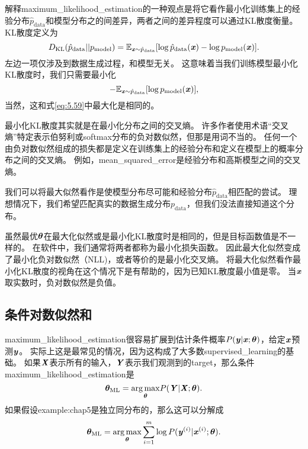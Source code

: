 解释\gls{maximum_likelihood_estimation}的一种观点是将它看作最小化训练集上的经验分布$\hat{p}_{\text{data}}$和模型分布之的间差异，两者之间的差异程度可以通过KL散度衡量。
KL散度定义为
\begin{equation}
    D_{\text{KL}}(\hat{p}_{\text{data}} || p_{\text{model}}) = \mathbb{E}_{\boldsymbol{\mathit{x}} \sim \hat{p}_{\text{data}}} [ \log \hat{p}_{\text{data}}(\boldsymbol{\mathit{x}}) - \log p_{\text{model}}(\boldsymbol{\mathit{x}}) ] .
\end{equation}
左边一项仅涉及到数据生成过程，和模型无关。
这意味着当我们训练模型最小化KL散度时，我们只需要最小化
\begin{equation}
    -\mathbb{E}_{\boldsymbol{\mathit{x}} \sim \hat{p}_{\text{data}}} [ \log p_{\text{model}}(\boldsymbol{\mathit{x}})  ] ,
\end{equation}
当然，这和式\ref{eq:5.59}中最大化是相同的。


最小化KL散度其实就是在最小化分布之间的交叉熵。
许多作者使用术语“交叉熵”特定表示伯努利或softmax分布的负对数似然，但那是用词不当的。
任何一个由负对数似然组成的损失都是定义在训练集上的经验分布和定义在模型上的概率分布之间的交叉熵。
例如，\gls{mean_squared_error}是经验分布和高斯模型之间的交叉熵。

我们可以将最大似然看作是使模型分布尽可能和经验分布$\hat{p}_{\text{data}}$相匹配的尝试。
理想情况下，我们希望匹配真实的数据生成分布$p_{\text{data}}$，但我们没法直接知道这个分布。

虽然最优$\boldsymbol{\theta}$在最大化似然或是最小化KL散度时是相同的，但是目标函数值是不一样的。
在软件中，我们通常将两者都称为最小化损失函数。
因此最大化似然变成了最小化负对数似然（NLL)，或者等价的是最小化交叉熵。
将最大化似然看作最小化KL散度的视角在这个情况下是有帮助的，因为已知KL散度最小值是零。
当$\boldsymbol{\mathit{x}}$取实数时，负对数似然是负值。

\subsection{条件对数似然和}
\label{sec:conditional_log_likelihood_and_mean_squared_error}
\gls{maximum_likelihood_estimation}很容易扩展到估计条件概率$P(\boldsymbol{\mathit{y}}|\boldsymbol{\mathit{x}};\boldsymbol{\theta})$，给定$\boldsymbol{\mathit{x}}$预测$\boldsymbol{\mathit{y}}$。
实际上这是最常见的情况，因为这构成了大多数\gls{supervised_learning}的基础。
如果$\boldsymbol{\mathit{X}}$表示所有的输入，$\boldsymbol{\mathit{Y}}$表示我们观测到的\gls{target}，那么条件\gls{maximum_likelihood_estimation}是
\begin{equation}
    \boldsymbol{\theta}_{\text{ML}} = \underset{\boldsymbol{\theta}}{\arg\max} P(\boldsymbol{\mathit{Y}} | \boldsymbol{\mathit{X}}; \boldsymbol{\theta}).
\end{equation}
如果假设\gls{example:chap5}是独立同分布的，那么这可以分解成
\begin{equation}
\label{eq:5.63}
    \boldsymbol{\theta}_{\text{ML}} = \underset{\boldsymbol{\theta}}{\arg\max} \sum_{i=1}^m \log P(\boldsymbol{\mathit{y}}^{(i)} | \boldsymbol{\mathit{x}}^{(i)}; \boldsymbol{\theta}).
\end{equation}

